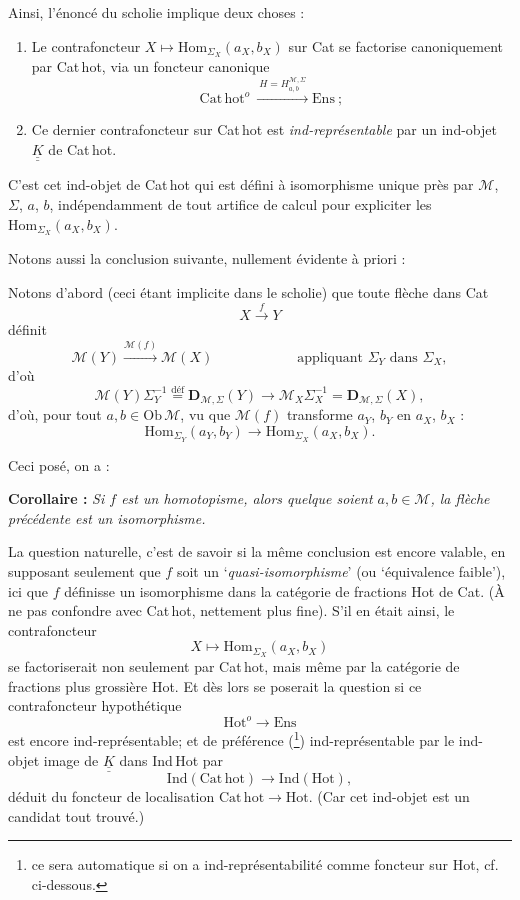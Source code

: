 \documentclass[11pt]{article}
\newcommand{\printedpage}[1]{\marginpar{\footnotesize p.~#1}}
\newcommand{\msp}[1]{\marginpar{\footnotesize [#1]}}
\newcommand{\cM}{\mathcal{M}}
\newcommand{\KK}{\underline{\underline{K}}}
\newcommand{\dfeq}{\overset{\text{déf}}{=}}
\newcommand{\Cathot}{\mathrm{Cat\,hot}}
\begin{document}
Ainsi, l'énoncé du scholie implique deux choses :

\begin{enumerate}
\item[a)] Le contrafoncteur $X\longmapsto\mathrm{Hom}_{\Sigma_X}(a_X,b_X)$ sur Cat se factorise canoniquement par Cat\,hot, via un foncteur canonique
\[
\Cathot^{o}\ \xrightarrow{\ H=H^{\cM,\Sigma}_{a,b}\ }\mathrm{Ens}\ ;
\]
\item[b)] Ce dernier contrafoncteur sur Cat\,hot est \textit{ind-représentable} par un ind-objet $\KK$ de Cat\,hot.
\end{enumerate}

C'est cet ind-objet de Cat\,hot qui est défini à isomorphisme unique près par $\cM$, $\Sigma$, $a$, $b$, indépendamment de tout artifice de calcul pour expliciter les $\mathrm{Hom}_{\Sigma_X}(a_X,b_X)$.

Notons aussi la conclusion suivante, nullement évidente à priori :

\msp{page 35}
Notons d'abord (ceci étant implicite dans le scholie) que toute flèche dans Cat
\[
X\xrightarrow{\ f\ }Y
\]
définit
\[
\cM(Y)\xrightarrow{\cM(f)}\cM(X) \qquad\qquad\qquad \text{appliquant } \Sigma_Y \text{ dans } \Sigma_X,
\]
d'où
\[
\cM(Y)\Sigma_Y^{-1}\dfeq\mathbf{D}_{\cM,\Sigma}(Y)\longrightarrow\cM_X\Sigma_X^{-1}=\mathbf{D}_{\cM,\Sigma}(X),
\]
 d'où, pour tout $a,b\in\mathrm{Ob}\,\cM$, vu que $\cM(f)$ transforme $a_Y$, $b_Y$ en $a_X$, $b_X$ :
\[
\boxed{\mathrm{Hom}_{\Sigma_Y}(a_Y,b_Y)\longrightarrow\mathrm{Hom}_{\Sigma_X}(a_X,b_X).}
\]

Ceci posé, on a :

\textbf{Corollaire :} \textit{Si $f$ est un homotopisme, alors quelque soient $a,b\in\cM$, la flèche précédente est un isomorphisme.} %

La question naturelle, c'est de savoir si la même conclusion est encore valable, en supposant seulement que $f$ soit un ‘\textit{quasi-isomorphisme}’ (ou ‘équivalence faible’), ici que $f$ définisse un isomorphisme dans la catégorie de fractions Hot de Cat. (À ne pas confondre avec Cat\,hot,
\printedpage{22}
\msp{page 36}
nettement plus fine). S'il en était ainsi, le contrafoncteur
\[
X\longmapsto\mathrm{Hom}_{\Sigma_X}(a_X,b_X)
\]
se factoriserait non seulement par Cat\,hot, mais même par la catégorie de fractions plus grossière Hot. Et dès lors se poserait la question si ce contrafoncteur hypothétique
\[
\mathrm{Hot}^{o}\longrightarrow\mathrm{Ens}
\]
est encore ind-représentable; et de préférence (\footnote[5]{ce sera automatique si on a ind-représentabilité comme foncteur sur Hot, cf. ci-dessous.}) ind-représentable par le ind-objet image de $\KK$ dans Ind\,Hot par
\[
\mathrm{Ind}(\Cathot)\longrightarrow\mathrm{Ind}(\mathrm{Hot}),
\]
déduit du foncteur de localisation $\Cathot\longrightarrow\mathrm{Hot}$. (Car cet ind-objet est un candidat tout trouvé.)
\end{document}
